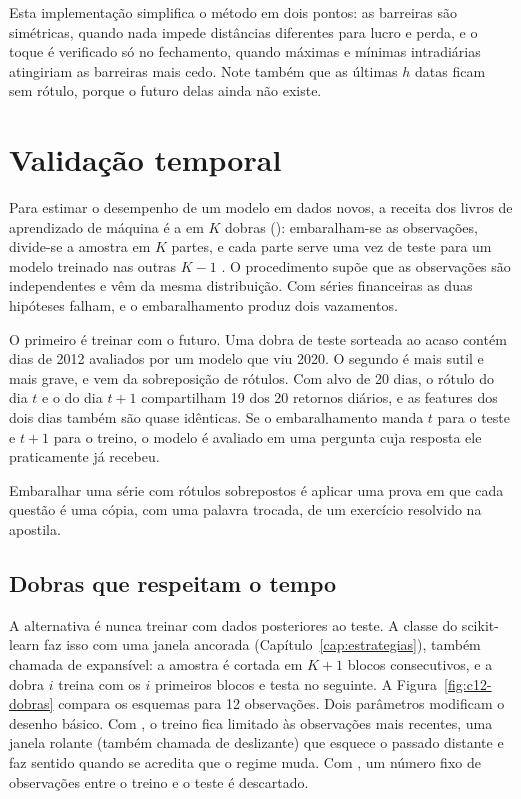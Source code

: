 Esta implementação simplifica o método em dois pontos: as barreiras são simétricas, quando nada impede distâncias diferentes para lucro e perda, e o toque é verificado só no fechamento, quando máximas e mínimas intradiárias atingiriam as barreiras mais cedo. Note também que as últimas $h$ datas ficam sem rótulo, porque o futuro delas ainda não existe.

\section{Validação temporal}
\label{sec:c12-validacao}

Para estimar o desempenho de um modelo em dados novos, a receita dos livros de aprendizado de máquina é a  em $K$ dobras (): embaralham-se as observações, divide-se a amostra em $K$ partes, e cada parte serve uma vez de teste para um modelo treinado nas outras $K-1$ \citep[capítulo 5]{james2021}. O procedimento supõe que as observações são independentes e vêm da mesma distribuição. Com séries financeiras as duas hipóteses falham, e o embaralhamento produz dois vazamentos.

O primeiro é treinar com o futuro. Uma dobra de teste sorteada ao acaso contém dias de 2012 avaliados por um modelo que viu 2020. O segundo é mais sutil e mais grave, e vem da sobreposição de rótulos. Com alvo de 20 dias, o rótulo do dia $t$ e o do dia $t+1$ compartilham 19 dos 20 retornos diários, e as features dos dois dias também são quase idênticas. Se o embaralhamento manda $t$ para o teste e $t+1$ para o treino, o modelo é avaliado em uma pergunta cuja resposta ele praticamente já recebeu.

\begin{intuicao}
Embaralhar uma série com rótulos sobrepostos é aplicar uma prova em que cada questão é uma cópia, com uma palavra trocada, de um exercício resolvido na apostila.
\end{intuicao}

\subsection{Dobras que respeitam o tempo}

A alternativa é nunca treinar com dados posteriores ao teste. A classe  do scikit-learn faz isso com uma janela ancorada (Capítulo~\ref{cap:estrategias}), também chamada de expansível: a amostra é cortada em $K+1$ blocos consecutivos, e a dobra $i$ treina com os $i$ primeiros blocos e testa no seguinte. A Figura~\ref{fig:c12-dobras} compara os esquemas para 12 observações. Dois parâmetros modificam o desenho básico. Com , o treino fica limitado às observações mais recentes, uma janela rolante (também chamada de deslizante) que esquece o passado distante e faz sentido quando se acredita que o regime muda. Com , um número fixo de observações entre o treino e o teste é descartado.

